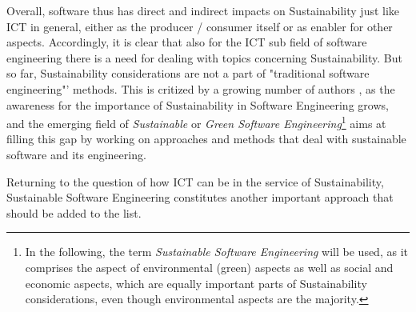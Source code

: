 Overall, software thus has direct and indirect impacts on Sustainability just like ICT in general, either as the producer / consumer itself or as enabler for other aspects. %
 Accordingly, it is clear that also for the ICT sub field of software engineering %
 there is a need for dealing with topics concerning Sustainability. But so far, Sustainability considerations are not a part of "traditional software engineering"'%
 methods. %
 This is critized by a growing number of authors %
, as the awareness for the importance of Sustainability in Software Engineering grows, and the emerging field of \textit{Sustainable} or \textit{Green Software Engineering}\footnote{In the following, the term \textit{Sustainable Software Engineering} will be used, as it comprises the aspect of environmental (green) aspects as well as social and economic aspects, which are equally important parts of Sustainability considerations, even though environmental aspects are the majority.} aims at filling this gap by %
working on approaches and methods that deal with sustainable software and its engineering.

Returning to the question of how ICT can be in the service of Sustainability, Sustainable Software Engineering constitutes another important approach that should be added to the list.  

